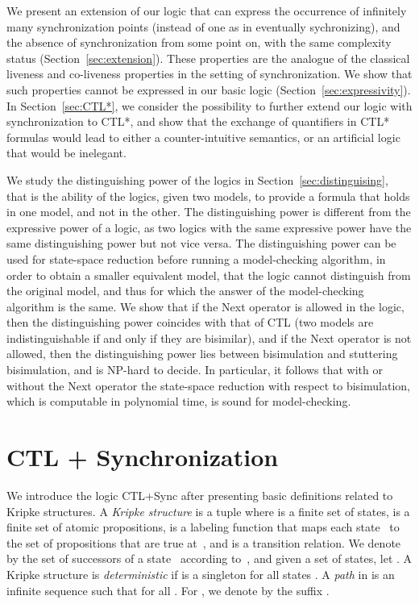 \documentclass{article}
\begin{document}
We present an extension of our logic that can express the occurrence
of infinitely many synchronization points (instead of one as in eventually
sychronizing), and the absence of synchronization from some point on, 
with the same complexity status (Section~\ref{sec:extension}). 
These properties are the analogue of the classical liveness and co-liveness 
properties in the setting of synchronization. 
We show that such properties cannot be expressed in our basic logic (Section~\ref{sec:expressivity}).
In Section~\ref{sec:CTL*}, we consider the possibility to further extend 
our logic with synchronization to CTL*, and show that the exchange of quantifiers
in CTL* formulas would lead to either a counter-intuitive semantics,
or an artificial logic that would be inelegant.

We study the distinguishing power of the logics in Section~\ref{sec:distinguising},
that is the ability of the logics, given two models, to provide a formula
that holds in one model, and not in the other. The distinguishing power is
different from the expressive power of a logic, as two logics with the
same expressive power have the same distinguishing power but not vice versa.
The distinguishing power can be used for state-space reduction before running
a model-checking algorithm, in order to obtain a smaller equivalent model,
that the logic cannot distinguish from the original model, and thus for which 
the answer of the model-checking algorithm is the same.
We show that if the Next operator is allowed in the logic, then 
the distinguishing power coincides with that of CTL (two models are
indistinguishable if and only if they are bisimilar), and if 
the Next operator is not allowed, then the distinguishing power lies
between bisimulation and stuttering bisimulation, and is NP-hard to decide.
In particular, it follows that with or without the Next operator the state-space reduction 
with respect to bisimulation, which is computable in polynomial time, is sound 
for model-checking.




\section{CTL + Synchronization}

We introduce the logic CTL+Sync after presenting basic definitions 
related to Kripke structures.
A \emph{Kripke structure} is a tuple 
where  is a finite set of states,  is a finite set of atomic propositions,
 is a labeling function that maps each state~ 
to the set  of propositions that are true at~,
and  is a transition relation.
We denote by  the set of successors of a state~ according to~,
and given a set  of states, let .
A Kripke structure is \emph{deterministic} if  is a singleton for all 
states .
A \emph{path} in  is an infinite sequence  such that 
for all . For , we denote by  the suffix .
\end{document}
